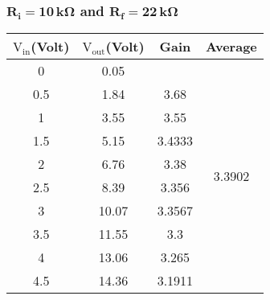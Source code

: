 \documentclass[12pt]{article}
\begin{document}
\subsubsection{$\mathbf{R_i = 10\, k \Omega}$ and $\mathbf{R_f = 22\, k \Omega}$}
\begin{table}[H]
	\centering
	\begin{tabular}{|c|c|c|c|}
		\hline
		$\mathrm{V_{in}}$(Volt) & $\mathrm{V_{out}}$(Volt) & Gain             & Average                            \\ \hline \hline
		0            & 0.05          &        & \multirow{10}{*}{3.3902} \\ \cline{1-3}
		0.5          & 1.84          & 3.68   &                          \\ \cline{1-3}
		1            & 3.55          & 3.55   &                          \\ \cline{1-3}
		1.5          & 5.15          & 3.4333 &                          \\ \cline{1-3}
		2            & 6.76          & 3.38   &                          \\ \cline{1-3}
		2.5          & 8.39          & 3.356  &                          \\ \cline{1-3}
		3            & 10.07         & 3.3567 &                          \\ \cline{1-3}
		3.5          & 11.55         & 3.3    &                          \\ \cline{1-3}
		4            & 13.06         & 3.265  &                          \\ \cline{1-3}
		4.5          & 14.36         & 3.1911 &                          \\ \hline
	\end{tabular}
\end{table}
\end{document}
